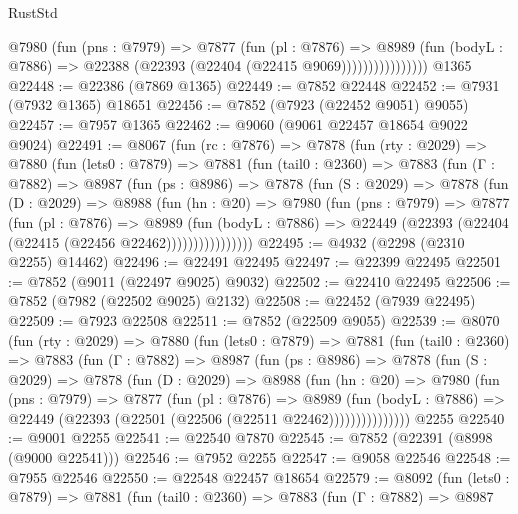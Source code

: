 \begin{lexlean}{RustStd}
\begin{coremodule}
                      @7980
                        (fun (pns : @7979) =>
                        @7877
                          (fun (pl : @7876) =>
                          @8989
                            (fun (bodyL : @7886) =>
                            @22388 (@22393 (@22404 (@22415 @9069))))))))))))))))
    @1365
@22448 := @22386 (@7869 @1365)
@22449 := @7852 @22448
@22452 := @7931 (@7932 @1365) @18651
@22456 := @7852 (@7923 (@22452 @9051) @9055)
@22457 := @7957 @1365
@22462 := @9060 (@9061 @22457 @18654 @9022 @9024)
@22491 := @8067
    (fun (rc : @7876) =>
    @7878
      (fun (rty : @2029) =>
      @7880
        (fun (lets0 : @7879) =>
        @7881
          (fun (tail0 : @2360) =>
          @7883
            (fun (Γ : @7882) =>
            @8987
              (fun (ps : @8986) =>
              @7878
                (fun (S : @2029) =>
                @7878
                  (fun (D : @2029) =>
                  @8988
                    (fun (hn : @20) =>
                    @7980
                      (fun (pns : @7979) =>
                      @7877
                        (fun (pl : @7876) =>
                        @8989
                          (fun (bodyL : @7886) =>
                          @22449 (@22393 (@22404 (@22415 (@22456 @22462))))))))))))))))
@22495 := @4932 (@2298 (@2310 @2255) @14462)
@22496 := @22491 @22495
@22497 := @22399 @22495
@22501 := @7852 (@9011 (@22497 @9025) @9032)
@22502 := @22410 @22495
@22506 := @7852 (@7982 (@22502 @9025) @2132)
@22508 := @22452 (@7939 @22495)
@22509 := @7923 @22508
@22511 := @7852 (@22509 @9055)
@22539 := @8070
    (fun (rty : @2029) =>
    @7880
      (fun (lets0 : @7879) =>
      @7881
        (fun (tail0 : @2360) =>
        @7883
          (fun (Γ : @7882) =>
          @8987
            (fun (ps : @8986) =>
            @7878
              (fun (S : @2029) =>
              @7878
                (fun (D : @2029) =>
                @8988
                  (fun (hn : @20) =>
                  @7980
                    (fun (pns : @7979) =>
                    @7877
                      (fun (pl : @7876) =>
                      @8989
                        (fun (bodyL : @7886) =>
                        @22449 (@22393 (@22501 (@22506 (@22511 @22462)))))))))))))))
    @2255
@22540 := @9001 @2255
@22541 := @22540 @7870
@22545 := @7852 (@22391 (@8998 (@9000 @22541)))
@22546 := @7952 @2255
@22547 := @9058 @22546
@22548 := @7955 @22546
@22550 := @22548 @22457 @18654
@22579 := @8092
    (fun (lets0 : @7879) =>
    @7881
      (fun (tail0 : @2360) =>
      @7883
        (fun (Γ : @7882) =>
        @8987

\end{coremodule}
\end{lexlean}
